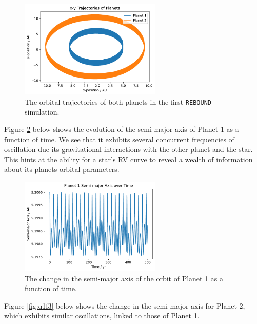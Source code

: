 \documentclass{article}
\newcommand{\rebound}{\texttt{REBOUND}}
\begin{document}
\begin{figure}[htp]
    \centering
    \includegraphics[width=0.6\textwidth]{q1f1.pdf}
    \captionsetup{justification=centering}
    \caption{The orbital trajectories of both planets in the first \rebound{} simulation.}
    \label{fig:q1f1}
\end{figure}

\newpage

Figure \ref{fig:q1f2} below shows the evolution of the semi-major axis of Planet 1 as a function of time. We see that it exhibits several concurrent frequencies of oscillation due its gravitational interactions with the other planet and the star. This hints at the ability for a star's RV curve to reveal a wealth of information about its planets orbital parameters. 

\begin{figure}[htp]
    \centering
    \includegraphics[width=0.6\textwidth]{q1f2.pdf}
    \captionsetup{justification=centering}
    \caption{The change in the semi-major axis of the orbit of Planet 1 as a function of time.}
    \label{fig:q1f2}
\end{figure}

Figure \ref{fig:q1f3} below shows the change in the semi-major axis for Planet 2, which exhibits similar oscillations, linked to those of Planet 1.
\end{document}
